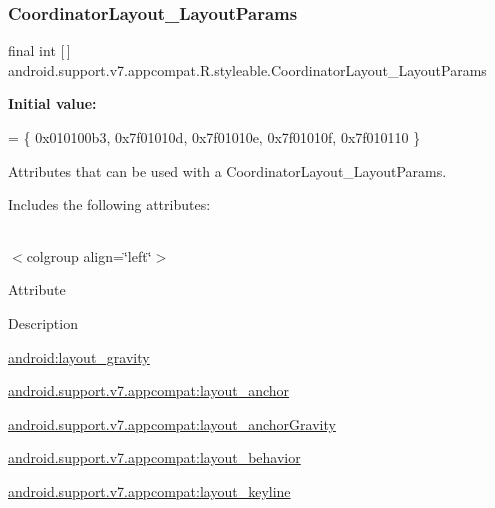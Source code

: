 \subsubsection{\texorpdfstring{Coordinator\+Layout\+\_\+\+Layout\+Params}{CoordinatorLayout\_LayoutParams}}
{\footnotesize\ttfamily final int \mbox{[}$\,$\mbox{]} android.\+support.\+v7.\+appcompat.\+R.\+styleable.\+Coordinator\+Layout\+\_\+\+Layout\+Params\hspace{0.3cm}{\ttfamily [static]}}

{\bfseries Initial value\+:}
\begin{DoxyCode}
= \{
            0x010100b3, 0x7f01010d, 0x7f01010e, 0x7f01010f,
            0x7f010110
        \}
\end{DoxyCode}
Attributes that can be used with a Coordinator\+Layout\+\_\+\+Layout\+Params. 

Includes the following attributes\+:

\tabulinesep=1mm
\begin{longtabu} spread 0pt [c]{*{0}{|X[-1]}|}
\hline
\end{longtabu}
$<$colgroup align=\char`\"{}left\char`\"{}$>$ 

Attribute

Description 

{\ttfamily \hyperlink{classandroid_1_1support_1_1v7_1_1appcompat_1_1R_1_1styleable_a2bbafef211aa759215c44685dec3bdfb}{android\+:layout\+\_\+gravity}}

{\ttfamily \hyperlink{classandroid_1_1support_1_1v7_1_1appcompat_1_1R_1_1styleable_a0326fdc342fc459e0f22e865f9bafa9b}{android.\+support.\+v7.\+appcompat\+:layout\+\_\+anchor}}

{\ttfamily \hyperlink{classandroid_1_1support_1_1v7_1_1appcompat_1_1R_1_1styleable_ac5930c177fccf3156cc93d585d9e2e9c}{android.\+support.\+v7.\+appcompat\+:layout\+\_\+anchor\+Gravity}}

{\ttfamily \hyperlink{classandroid_1_1support_1_1v7_1_1appcompat_1_1R_1_1styleable_a3c5485968079da7140d1094aeaed49d7}{android.\+support.\+v7.\+appcompat\+:layout\+\_\+behavior}}

{\ttfamily \hyperlink{classandroid_1_1support_1_1v7_1_1appcompat_1_1R_1_1styleable_a71b92f33ca3d04c4ead0d908659739bf}{android.\+support.\+v7.\+appcompat\+:layout\+\_\+keyline}}

